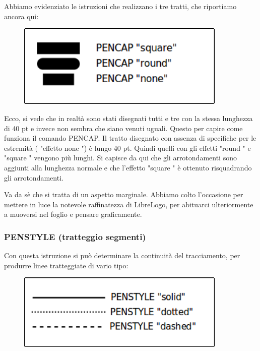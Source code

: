 Abbiamo evidenziato le istruzioni che realizzano i tre tratti, che riportiamo ancora qui:

\vskip 1cm

\begin{figure}[H]
   \centering
   \includegraphics[width=10.0cm,trim=8 8 8 8,clip]{./images/disegnare/disegnare-36.png}
   \label{dis-38}
\end{figure}

\vskip 1cm

Ecco, si vede che in realtà sono stati disegnati tutti e tre con la stessa lunghezza di 40 pt e invece non sembra che siano venuti uguali. Questo per capire come funziona il comando PENCAP. Il tratto disegnato con assenza di specifiche per le estremità ( "effetto none ")  è lungo 40 pt. Quindi quelli con gli effetti  "round " e  "square " vengono più lunghi. Si capisce da qui che gli arrotondamenti sono aggiunti alla lunghezza normale e che l'effetto  "square " è ottenuto risquadrando gli arrotondamenti.

Va da sè che si tratta di un aspetto marginale. Abbiamo colto l'occasione per mettere in luce la notevole raffinatezza di LibreLogo, per abituarci ulteriormente a muoversi nel foglio e pensare graficamente. 

\subsubsection{PENSTYLE (tratteggio segmenti)}

Con questa istruzione si può determinare la continuità del tracciamento, per produrre linee tratteggiate di vario tipo:

\vskip 1cm

\begin{figure}[H]
   \centering
   \includegraphics[width=10.0cm,trim=8 8 8 8,clip]{./images/disegnare/disegnare-38.png}
   \label{dis-39}
\end{figure}

